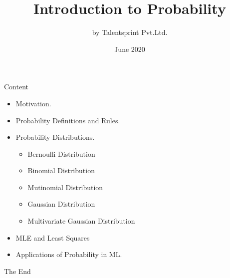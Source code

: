 \documentclass{beamer}
\title{Introduction to Probability}
\author{by Talentsprint Pvt.Ltd.}
\date{June 2020}
\begin{document}
\maketitle
\begin{frame}{Content}
	\begin{itemize}
		\item Motivation.
		\item Probability Definitions and Rules.
		\item Probability Distributions.
		\begin{itemize}
			\item Bernoulli Distribution
			\item Binomial Distribution
			\item Mutinomial Distribution
			\item Gaussian Distribution
			\item Multivariate Gaussian Distribution
		\end{itemize}
		\item MLE and Least Squares
		\item Applications of Probability in ML.
	\end{itemize}
\end{frame}	
\begin{frame}
\huge{\centerline{The End}}
\end{frame}
\end{document}
